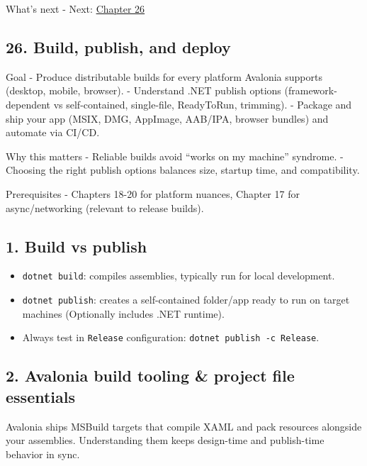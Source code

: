What's next - Next: \href{Chapter26.md}{Chapter 26}

\newpage

\subsection{26. Build, publish, and
deploy}\label{build-publish-and-deploy}

Goal - Produce distributable builds for every platform Avalonia supports
(desktop, mobile, browser). - Understand .NET publish options
(framework-dependent vs self-contained, single-file, ReadyToRun,
trimming). - Package and ship your app (MSIX, DMG, AppImage, AAB/IPA,
browser bundles) and automate via CI/CD.

Why this matters - Reliable builds avoid ``works on my machine''
syndrome. - Choosing the right publish options balances size, startup
time, and compatibility.

Prerequisites - Chapters 18-20 for platform nuances, Chapter 17 for
async/networking (relevant to release builds).

\subsection{1. Build vs publish}\label{build-vs-publish}

\begin{itemize}
\tightlist
\item
  \passthrough{\lstinline!dotnet build!}: compiles assemblies, typically
  run for local development.
\item
  \passthrough{\lstinline!dotnet publish!}: creates a self-contained
  folder/app ready to run on target machines (Optionally includes .NET
  runtime).
\item
  Always test in \passthrough{\lstinline!Release!} configuration:
  \passthrough{\lstinline!dotnet publish -c Release!}.
\end{itemize}

\subsection{2. Avalonia build tooling \& project file
essentials}\label{avalonia-build-tooling-project-file-essentials}

Avalonia ships MSBuild targets that compile XAML and pack resources
alongside your assemblies. Understanding them keeps design-time and
publish-time behavior in sync.

